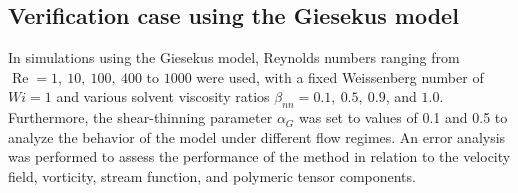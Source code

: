 \documentclass[preprint, 12pt]{elsarticle}
\begin{document}
\subsection{Verification case using the Giesekus model}\label{subsec_giesekus}

In simulations using the Giesekus model, Reynolds numbers ranging from $\operatorname{Re} = 1,\ 10,\ 100,\ 400$ to $1000$ were used, with a fixed Weissenberg number of $Wi = 1$ and various solvent viscosity ratios $\beta_{nn} = 0.1,\ 0.5,\ 0.9$, and $1.0$. Furthermore, the shear-thinning parameter $\alpha_G$ was set to values of 0.1 and 0.5 to analyze the behavior of the model under different flow regimes. An error analysis was performed to assess the performance of the method in relation to the velocity field, vorticity, stream function, and polymeric tensor components.
\end{document}
